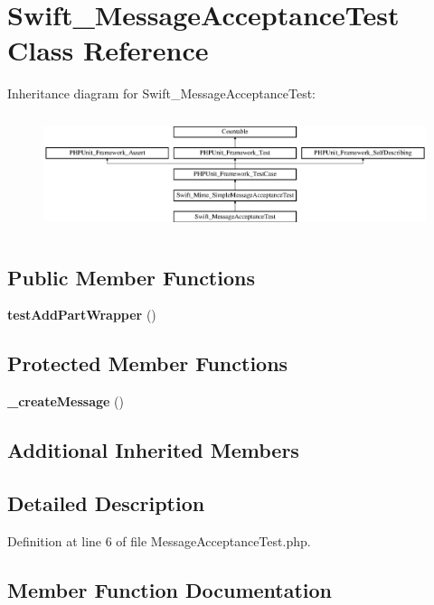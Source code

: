 \section{Swift\+\_\+\+Message\+Acceptance\+Test Class Reference}
\label{class_swift___message_acceptance_test}
Inheritance diagram for Swift\+\_\+\+Message\+Acceptance\+Test\+:\begin{figure}[H]
\begin{center}
\leavevmode
\includegraphics[height=3.456790cm]{class_swift___message_acceptance_test}
\end{center}
\end{figure}
\subsection*{Public Member Functions}
\begin{DoxyCompactItemize}
\item 
{\bf test\+Add\+Part\+Wrapper} ()
\end{DoxyCompactItemize}
\subsection*{Protected Member Functions}
\begin{DoxyCompactItemize}
\item 
{\bf \+\_\+create\+Message} ()
\end{DoxyCompactItemize}
\subsection*{Additional Inherited Members}


\subsection{Detailed Description}


Definition at line 6 of file Message\+Acceptance\+Test.\+php.



\subsection{Member Function Documentation}
